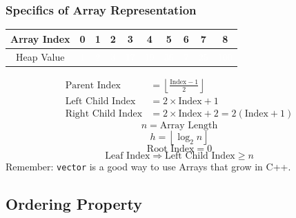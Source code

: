 \documentclass[10pt,compress]{beamer}
\begin{document}
\begin{frame}
  \frametitle{Specifics of Array Representation}
  \begin{tabular}{c|c|c|c|c|c|c|c|c|c|}\cline{2-10}
    Array Index & 0                                           & 1                                           & 2                                           & 3                                            & 4                                            & 5                                            & 6                                           & 7                                            & 8                                             \\\hline
    Heap Value  & \cellcolor{aggiemaroon}\textcolor{white}{1} & \cellcolor{aggiemaroon}\textcolor{white}{2} & \cellcolor{aggiemaroon}\textcolor{white}{3} & \cellcolor{aggiemaroon}\textcolor{white}{17} & \cellcolor{aggiemaroon}\textcolor{white}{19} & \cellcolor{aggiemaroon}\textcolor{white}{36} & \cellcolor{aggiemaroon}\textcolor{white}{7} & \cellcolor{aggiemaroon}\textcolor{white}{25} & \cellcolor{aggiemaroon}\textcolor{white}{100} \\\cline{2-10}
  \end{tabular}
  \begin{align*}
    \text{Parent Index}      & = \left\lfloor\frac{\text{Index} - 1}{2}\right\rfloor      \\
    \text{Left Child Index}  & = 2\times\text{Index} + 1                                  \\
    \text{Right Child Index} & = 2\times\text{Index} + 2 = 2\left(\text{Index} + 1\right)
  \end{align*}
  \[
    n = \text{Array Length}
  \]
  \[
    h = \left\lfloor\log_2 n\right\rfloor
  \]
  \[
    \text{Root Index} = 0
  \]
  \[
    \text{Leaf Index} \Rightarrow \text{Left Child Index} \geq n
  \]
  Remember: \texttt{vector} is a good way to use Arrays that grow in C++.
\end{frame}

\newtheorem*{bst_ordering}{Recall -- Binary Search Tree Order Property}
\newtheorem*{min_heap_ordering}{Min-Heap Order Property}
\newtheorem*{max_heap_ordering}{Max-Heap Order Property}

\subsection{Ordering Property}
\end{document}
